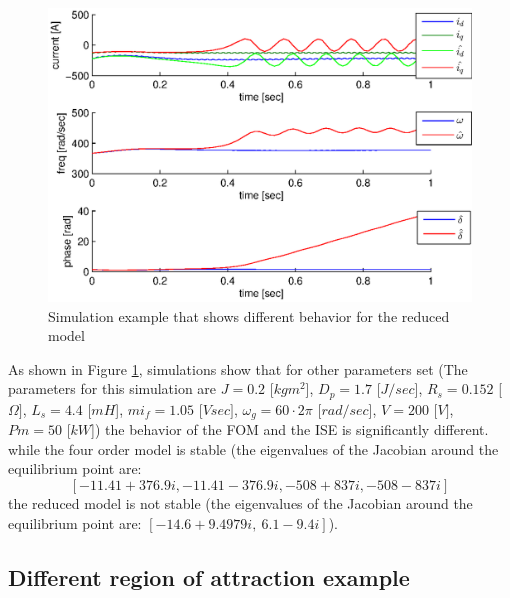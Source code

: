 \documentclass[conference]{IEEEtran}
\begin{document}
\begin{figure}[ht]
\includegraphics[scale=0.6]{simDiffBehavior1}

\caption{Simulation example that shows different behavior for the 
         reduced model}
\label{fig:InfBusOne1DiffBehavior1}
\end{figure}

As shown in Figure \ref{fig:InfBusOne1DiffBehavior1}, simulations
show that for other parameters set (The parameters for this simulation
are $J=0.2$ {[}$kgm^{2}${]}, $D_{p}=1.7$ {[}$J/sec${]}, $R_{s}=0.152$
{[}$\Omega]$, $L_{s}=4.4$ {[}$mH${]}, $mi_{f}=1.05$ {[}$Vsec]$,
$\omega_{g}=60\cdotp2\pi$ {[}$rad/sec${]}, $V=200$ {[}$V]$, $Pm=50$
{[}$kW${]}) the behavior of the FOM and the ISE is significantly different. while the four order model is stable
(the eigenvalues of the Jacobian around the equilibrium point are:
$$\left[-11.41+376.9i,-11.41-376.9i,-508+837i,-508-837i\right]$$
the reduced model is not stable (the eigenvalues of the Jacobian
around the equilibrium point are: 
$\left[-14.6+9.4979i,\:6.1-9.4i\right]$).

\subsection{Different region of attraction example}
\end{document}
